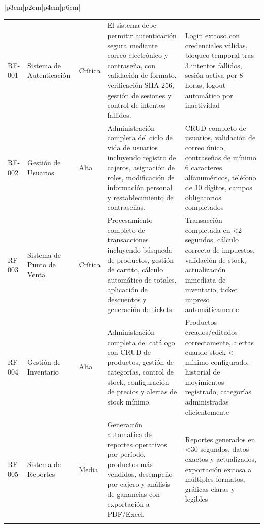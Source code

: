 \documentclass[12pt,letterpaper]{article}
\begin{document}
\begin{longtable}{|p{3cm}|p{2cm}|p{4cm}|p{6cm}|}
\begin{longtable}{|>{\centering}p{1.5cm}|p{3.5cm}|>{\centering}p{2cm}|p{6.5cm}|>{\centering\arraybackslash}p{2.5cm}|}
\multicolumn{5}{|c|}{\cellcolor{cobraorange!20}\textbf{FASE 1: APLICACIÓN DE ESCRITORIO}} \\
\hline

RF-001 & Sistema de Autenticación & Crítica & El sistema debe permitir autenticación segura mediante correo electrónico y contraseña, con validación de formato, verificación SHA-256, gestión de sesiones y control de intentos fallidos. & Login exitoso con credenciales válidas, bloqueo temporal tras 3 intentos fallidos, sesión activa por 8 horas, logout automático por inactividad \\
\hline

RF-002 & Gestión de Usuarios & Alta & Administración completa del ciclo de vida de usuarios incluyendo registro de cajeros, asignación de roles, modificación de información personal y restablecimiento de contraseñas. & CRUD completo de usuarios, validación de correo único, contraseñas de mínimo 6 caracteres alfanuméricos, teléfono de 10 dígitos, campos obligatorios completados \\
\hline

RF-003 & Sistema de Punto de Venta & Crítica & Procesamiento completo de transacciones incluyendo búsqueda de productos, gestión de carrito, cálculo automático de totales, aplicación de descuentos y generación de tickets. & Transacción completada en <2 segundos, cálculo correcto de impuestos, validación de stock, actualización inmediata de inventario, ticket impreso automáticamente \\
\hline

RF-004 & Gestión de Inventario & Alta & Administración completa del catálogo con CRUD de productos, gestión de categorías, control de stock, configuración de precios y alertas de stock mínimo. & Productos creados/editados correctamente, alertas cuando stock < mínimo configurado, historial de movimientos registrado, categorías administradas eficientemente \\
\hline

RF-005 & Sistema de Reportes & Media & Generación automática de reportes operativos por período, productos más vendidos, desempeño por cajero y análisis de ganancias con exportación a PDF/Excel. & Reportes generados en <30 segundos, datos exactos y actualizados, exportación exitosa a múltiples formatos, gráficas claras y legibles \\
\hline

\multicolumn{5}{|c|}{\cellcolor{cobraorange!20}\textbf{FASE 2: PORTAL WEB}} \\
\hline


\end{longtable}
\end{longtable}
\end{document}
